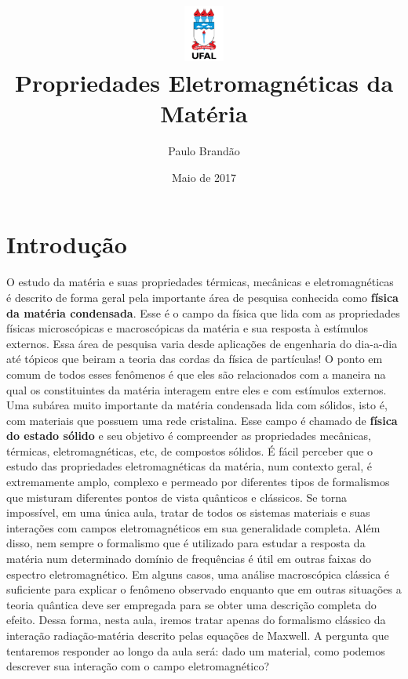 \documentclass{article}
\title{\includegraphics[width=0.1\textwidth]{ufallogo.png} \\
\Huge{\color{astral}\textbf{Propriedades Eletromagnéticas da Matéria}}}
\author{Paulo Brandão}
\date{Maio de 2017}
\begin{document}
\maketitle

\section{Introdução}

O estudo da matéria e suas propriedades térmicas, mecânicas e eletromagnéticas é descrito de forma geral pela importante área de pesquisa conhecida como \textbf{física da matéria condensada}. Esse é o campo da física que lida com as propriedades físicas microscópicas e macroscópicas da matéria e sua resposta à estímulos externos. Essa área de pesquisa varia desde aplicações de engenharia do dia-a-dia até tópicos que beiram a teoria das cordas da física de partículas! O ponto em comum de todos esses fenômenos é que eles são relacionados com a maneira na qual os constituintes da matéria interagem entre eles e com estímulos externos. Uma subárea muito importante da matéria condensada lida com sólidos, isto é, com materiais que possuem uma rede cristalina. Esse campo é chamado de \textbf{física do estado sólido} e seu objetivo é compreender as propriedades mecânicas, térmicas, eletromagnéticas, etc, de compostos sólidos. É fácil perceber que o estudo das propriedades eletromagnéticas da matéria, num contexto geral, é extremamente amplo, complexo e permeado por diferentes tipos de formalismos que misturam diferentes pontos de vista quânticos e clássicos. Se torna impossível, em uma única aula, tratar de todos os sistemas materiais e suas interações com campos eletromagnéticos em sua generalidade completa. Além disso, nem sempre o formalismo que é utilizado para estudar a resposta da matéria num determinado domínio de frequências é útil em outras faixas do espectro eletromagnético. Em alguns casos, uma análise macroscópica clássica é suficiente para explicar o fenômeno observado enquanto que em outras situações a teoria quântica deve ser empregada para se obter uma descrição completa do efeito. Dessa forma, nesta aula, iremos tratar apenas do formalismo clássico da interação radiação-matéria descrito pelas equações de Maxwell. A pergunta que tentaremos responder ao longo da aula será: dado um material, como podemos descrever sua interação com o campo eletromagnético? 
\end{document}
